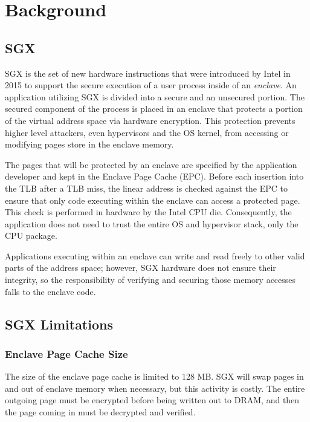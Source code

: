 \documentclass[letterpaper,twocolumn,10pt]{article}
\providecommand{\todo}[1]{{\protect\color{red}\noindent {\bf [TODO]} \emph{#1} {\bf [/TODO]}}}
\begin{document}

\section{Background}
\subsection{SGX}
SGX is the set of new hardware instructions that were introduced by Intel in 2015 to
support the secure execution of a user process inside of an \emph{enclave}. An
application utilizing SGX is divided into a secure and an unsecured portion.
The secured component of the process is placed in an enclave that protects a
portion of the virtual address space via hardware encryption. This protection 
prevents higher level attackers, even hypervisors and the OS kernel, from accessing
or modifying pages store in the enclave memory.


The pages that will be protected by an enclave are specified by the application
developer and kept in the Enclave Page Cache (EPC). Before each insertion into
the TLB after a TLB miss, the linear address is checked against the EPC to
ensure that only code executing within the enclave can access a protected page.
This check is performed in hardware by the Intel CPU die. Consequently, the
application does not need to trust the entire OS and hypervisor stack, only the
CPU package.

Applications executing within an
enclave can write and read freely to other valid parts of the address space;
however, SGX hardware does not ensure their integrity, so the responsibility of
verifying and securing those memory accesses falls to the enclave code. 



\subsection{SGX Limitations}
\subsubsection{Enclave Page Cache Size}
The size of the enclave page cache is limited to 128 MB. SGX will swap
pages in and out of enclave memory when necessary, but this activity is costly.
The entire outgoing page must be encrypted before being written out to DRAM,
and then the page coming in must be decrypted and verified. 
\end{document}
